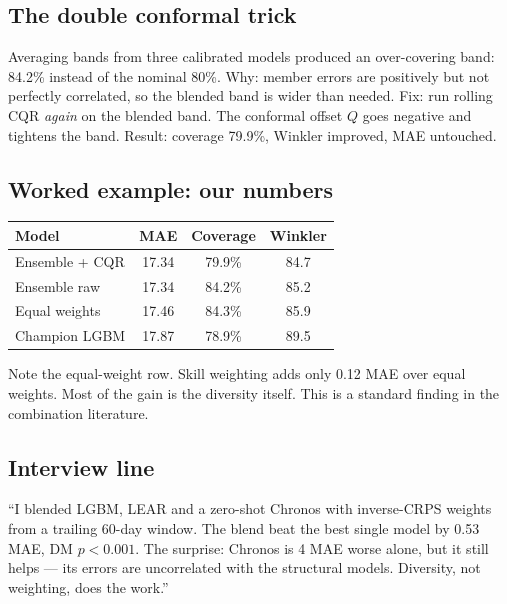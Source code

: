\subsection{The double conformal trick}

Averaging bands from three calibrated models produced an
over-covering band: 84.2\% instead of the nominal 80\%.
Why: member errors are positively but not perfectly correlated,
so the blended band is wider than needed.
Fix: run rolling CQR \emph{again} on the blended band.
The conformal offset $Q$ goes negative and tightens the band.
Result: coverage 79.9\%, Winkler improved, MAE untouched.

\subsection{Worked example: our numbers}

\begin{tabular}{lccc}
\hline
Model & MAE & Coverage & Winkler \\
\hline
Ensemble + CQR & 17.34 & 79.9\% & 84.7 \\
Ensemble raw & 17.34 & 84.2\% & 85.2 \\
Equal weights & 17.46 & 84.3\% & 85.9 \\
Champion LGBM & 17.87 & 78.9\% & 89.5 \\
\hline
\end{tabular}

\vspace{0.5em}
Note the equal-weight row. Skill weighting adds only 0.12 MAE over
equal weights. Most of the gain is the diversity itself.
This is a standard finding in the combination literature.

\subsection{Interview line}

``I blended LGBM, LEAR and a zero-shot Chronos with inverse-CRPS
weights from a trailing 60-day window. The blend beat the best
single model by 0.53 MAE, DM $p < 0.001$. The surprise: Chronos is
4 MAE worse alone, but it still helps --- its errors are
uncorrelated with the structural models. Diversity, not weighting,
does the work.''
